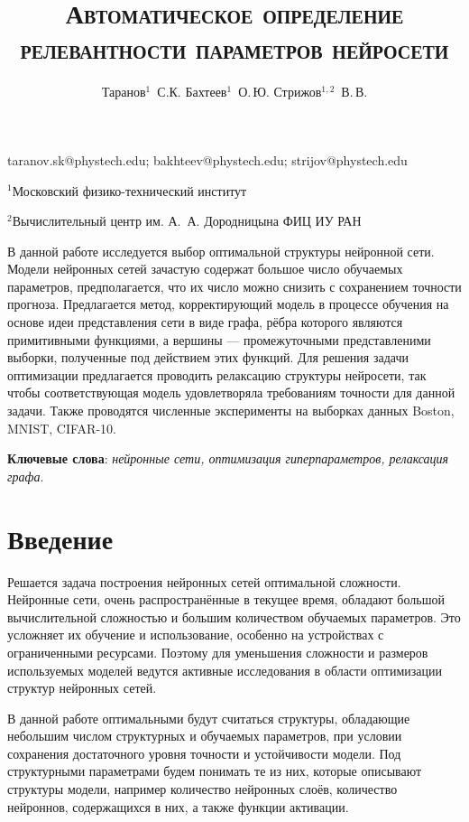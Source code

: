 \documentclass[12pt, twoside]{article}
\begin{document}
\title{\textsc{Автоматическое определение релевантности параметров нейросети}}

\author
    {Таранов$^1$~С.К. Бахтеев$^1$~О.\,Ю.  Стрижов$^{1,2}$~В.\,В.} 

\email
    {taranov.sk@phystech.edu; bakhteev@phystech.edu; strijov@phystech.edu}
    
\organization
    {$^1$Московский физико-технический институт\par
    $^2$Вычислительный центр им. А.~А. Дородницына ФИЦ ИУ РАН}

\abstract
	{В данной работе исследуется выбор оптимальной структуры нейронной сети.  Модели нейронных сетей зачастую содержат большое число обучаемых параметров, предполагается, что их число можно снизить с сохранением точности прогноза. Предлагается метод, корректирующий модель в процессе обучения на основе идеи представления сети в виде графа, рёбра которого являются примитивными функциями, а вершины --- промежуточными представленими выборки, полученные под действием этих функций. Для решения задачи оптимизации предлагается проводить релаксацию структуры нейросети, так чтобы соответствующая модель удовлетворяла требованиям точности для данной задачи. Также проводятся численные эксперименты на выборках данных Boston, MNIST, CIFAR-10.

\bigskip
\textbf{Ключевые слова}: \emph {нейронные сети, оптимизация гиперпараметров, релаксация графа}.

}

\maketitle

\section{Введение}
Решается задача построения нейронных сетей оптимальной сложности. Нейронные сети, очень распространённые в текущее время, обладают большой вычислительной сложностью и большим количеством обучаемых параметров. Это усложняет их обучение и использование, особенно на устройствах с ограниченными ресурсами. Поэтому для уменьшения сложности и размеров используемых моделей ведутся активные исследования в области оптимизации структур нейронных сетей. 

В данной работе оптимальными будут считаться структуры, обладающие небольшим числом структурных и обучаемых параметров, при условии сохранения достаточного уровня точности и устойчивости модели. Под структурными параметрами будем понимать те из них, которые описывают структуры модели, например количество нейронных слоёв, количество нейроннов, содержащихся в них, а также функции активации. 
\end{document}
